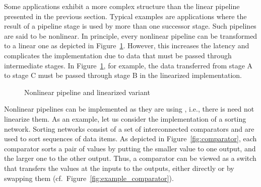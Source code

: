 Some applications exhibit a more complex structure than the linear pipeline presented in the previous section. Typical examples are applications where the result of a pipeline stage is used by more than one successor stage. Such pipelines are said to be nonlinear. In principle, every nonlinear pipeline can be transformed to a linear one as depicted in Figure~\ref{fig:linearization}. However, this increases the latency and complicates the implementation due to data that must be passed through intermediate stages. In Figure~\ref{fig:linearization}, for example, the data transferred from stage A to stage C must be passed through stage B in the linearized implementation.

\begin{figure}[!htb]
\centering%
\hspace{1cm}
\caption{Nonlinear pipeline and linearized variant}
\label{fig:linearization}
\end{figure}

Nonlinear pipelines can be implemented as they are using \embb, i.e., there is need not linearize them. As an example, let us consider the implementation of a sorting network. Sorting networks consist of a set of interconnected comparators and are used to sort sequences of data items. As depicted in Figure~\ref{fig:comparator}, each comparator sorts a pair of values by putting the smaller value to one output, and the larger one to the other output. Thus, a comparator can be viewed as a switch that transfers the values at the inputs to the outputs, either directly or by swapping them (cf.~Figure~\ref{fig:example_comparator}).

